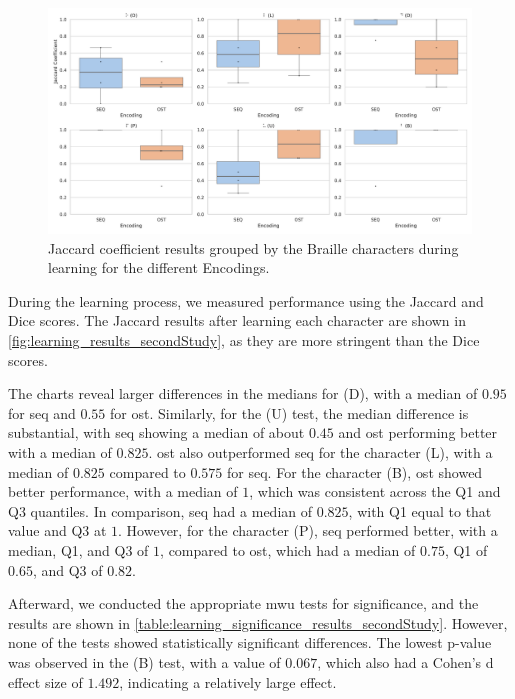 \begin{figure}
    \centering
    \includegraphics[width=\linewidth]{src/pictures/Study2Data_Experiment/study2_learning_results.pdf}
    \caption{Jaccard coefficient results grouped by the Braille characters during learning for the different Encodings.}
    \label{fig:learning_results_secondStudy}
\end{figure}

During the learning process, we measured performance using the Jaccard and Dice scores. The Jaccard results after learning each character are shown in \autoref{fig:learning_results_secondStudy}, as they are more stringent than the Dice scores.

The charts reveal larger differences in the medians for (D), with a median of $0.95$ for \gls{seq} and $0.55$ for \gls{ost}.
Similarly, for the (U) test, the median difference is substantial, with \gls{seq} showing a median of about $0.45$ and \gls{ost} performing better with a median of $0.825$.
\gls{ost} also outperformed \gls{seq} for the character (L), with a median of $0.825$ compared to $0.575$ for \gls{seq}.
For the character (B), \gls{ost} showed better performance, with a median of $1$, which was consistent across the Q1 and Q3 quantiles. In comparison, \gls{seq} had a median of $0.825$, with Q1 equal to that value and Q3 at $1$.
However, for the character (P), \gls{seq} performed better, with a median, Q1, and Q3 of $1$, compared to \gls{ost}, which had a median of $0.75$, Q1 of $0.65$, and Q3 of $0.82$.



Afterward, we conducted the appropriate \gls{mwu} tests for significance, and the results are shown in \autoref{table:learning_significance_results_secondStudy}.
However, none of the tests showed statistically significant differences.
The lowest p-value was observed in the (B) test, with a value of $0.067$, which also had a Cohen's d effect size of $1.492$, indicating a relatively large effect.

